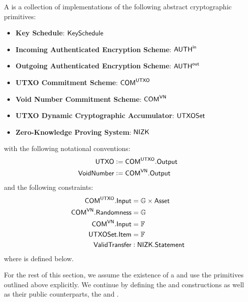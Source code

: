 \begin{definition}
    A \TransferConfiguration{} is a collection of implementations of the following abstract cryptographic primitives:
    \begin{itemize}
        \item \textbf{Key Schedule}: ${\textsf{KeySchedule}}$
        \item \textbf{Incoming Authenticated Encryption Scheme}: ${{\textsf{AUTH}}^\textsf{in}}$
        \item \textbf{Outgoing Authenticated Encryption Scheme}: ${{\textsf{AUTH}}^\textsf{out}}$
        \item \textbf{UTXO Commitment Scheme}: ${\textsf{COM}}^{{\textsf{UTXO}}}$
        \item \textbf{Void Number Commitment Scheme}: ${\textsf{COM}}^{{\textsf{VN}}}$
        \item \textbf{UTXO Dynamic Cryptographic Accumulator}: ${\textsf{UTXOSet}}$
        \item \textbf{Zero-Knowledge Proving System}: ${\textsf{NIZK}}$
    \end{itemize}
    with the following notational conventions:
    \begin{align*}
        {\textsf{UTXO}}       &:= {\textsf{COM}}^{{\textsf{UTXO}}}.{\textsf{Output}} \\
        {\textsf{VoidNumber}} &:= {\textsf{COM}}^{{\textsf{VN}}}.{\textsf{Output}} \\
    \end{align*}
    and the following constraints:
    \begin{align*}
        {\textsf{COM}}^{{\textsf{UTXO}}}.{\textsf{Input}}      &= {\mathbb{G}} \times {\textsf{Asset}} \\
        {\textsf{COM}}^{{\textsf{VN}}}.{\textsf{Randomness}}   &= {\mathbb{G}} \\
        {\textsf{COM}}^{{\textsf{VN}}}.{\textsf{Input}}        &= {\mathbb{F}} \\
        {\textsf{UTXOSet}}.{\textsf{Item}}           &= {\mathbb{F}} \\
        {\textsf{ValidTransfer}}           &: {\textsf{NIZK}}.{\textsf{Statement}}
    \end{align*}
    where \ValidTransfer{} is defined below.
\end{definition}

For the rest of this section, we assume the existence of a \TransferConfiguration{} and use the primitives outlined above explicitly. We continue by defining the \Sender{} and \Receiver{} constructions as well as their public counterparts, the \SenderPost{} and \ReceiverPost{}.

